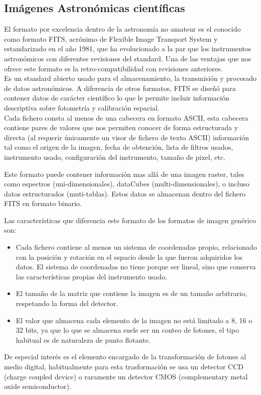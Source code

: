 	\subsection{Imágenes Astronómicas científicas}
	El formato por excelencia dentro de la astronomía no amateur es el conocido como formato FITS, acrónimo de Flexible Image Transport System y estandarizado en el año 1981, que ha evolucionado a la par que los instrumentos astronómicos con diferentes revisiones del standard. Una de las ventajas que nos ofrece este formato es la retro-compatibilidad con revisiones anteriores. \\
	Es un standard abierto usado para el almacenamiento, la transmisión y procesado de datos astronómicos. A diferencia de otros formatos, FITS se diseñó para contener datos de carácter científico lo que le permite incluir información descriptiva sobre fotometría y calibración espacial.\\
	Cada fichero consta al menos de una cabecera en formato ASCII, esta cabecera contiene pares de valores que nos permiten conocer de forma estructurada y directa (al requerir únicamente un visor de fichero de texto ASCII) información tal como el origen de la imagen, fecha de obtención, lista de filtros usados, instrumento usado, configuración del instrumento, tamaño de pixel, etc. 
	
	Este formato puede contener información mas allá de una imagen raster, tales como espectros (uni-dimensionales), dataCubes (multi-dimensionales), o incluso datos estructurados (muti-tablas). Estos datos se almacenan dentro del fichero FITS en formato binario.
	
	Las características que diferencia este formato de los formatos de imagen genérico son:
	\begin{itemize}
		\item Cada fichero contiene al menos un sistema de coordenadas propio, relacionado con la posición y rotación en el espacio desde la que fueron adquiridos los datos. El sistema de coordenadas no tiene porque ser lineal, sino que conserva las características propias del instrumento usado.
		\item El tamaño de la matriz que contiene la imagen es de un tamaño arbitrario, respetando la forma del detector.
		\item El valor que almacena cada elemento de la imagen no está limitado a 8, 16 o 32 bits, ya que lo que se almacena suele ser un conteo de fotones, el tipo habitual es de naturaleza de punto flotante.
	\end{itemize}
	De especial interés es el elemento encargado de la transformación de fotones al medio digital, habitualmente para esta trasformación se usa un detector CCD (charge coupled device) o raramente un detector CMOS (complementary metal oxide semiconductor).
	
